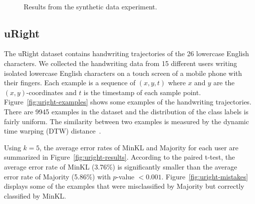 \documentclass{article}
\begin{document}
\begin{figure}[tb]
\begin{center}
{  \label{fig:synthetic-2}
}\\
\caption{Results from the synthetic data experiment.}
\label{fig:synthetic}
\end{center}
\vskip -0.2in
\end{figure}

\subsection{uRight}
The uRight dataset contains handwriting trajectories of the 26
lowercase English characters.  We collected the handwriting data from
15 different users writing isolated lowercase English characters on a
touch screen of a mobile phone with their fingers. Each example is a
sequence of $(x,y,t)$ where $x$ and $y$ are the $(x,y)$-coordinates
and $t$ is the timestamp of each sample
point. Figure~\ref{fig:uright-examples} shows some examples of the
handwriting trajectories. There are 9945 examples in the dataset and
the distribution of the class labels is fairly uniform. The similarity
between two examples is measured by the dynamic time warping (DTW)
distance~\cite{Bahlmann2004}.

Using $k = 5$, the average error rates of MinKL and Majority for each
user are summarized in Figure~\ref{fig:uright-results}. According to
the paired t-test, the average error rate of MinKL (3.76\%) is
significantly smaller than the average error rate of Majority (5.86\%)
with $p$-value $ < 0.001$. Figure~\ref{fig:uright-mistakes} displays
some of the examples that were misclassified by Majority but correctly
classified by MinKL.
\end{document}
